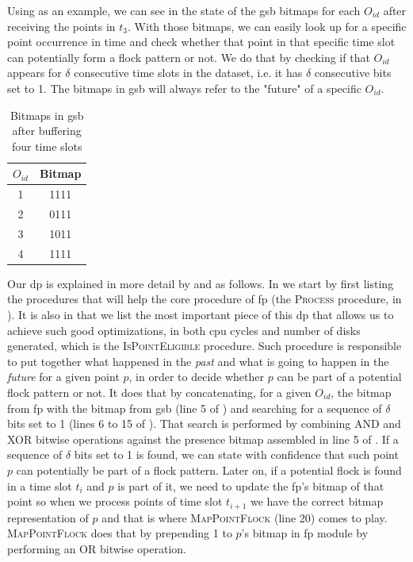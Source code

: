 Using  as an example, we can see in  the state of the \ac{gsb} bitmaps for each
$O_{id}$ after receiving the points in $t_3$. With those bitmaps, we can easily look up for a specific point occurrence
in time and check whether that point in that specific time slot can potentially form a flock pattern or not. We do that
by checking if that $O_{id}$ appears for $\delta$ consecutive time slots in the dataset, i.e. it has $\delta$
consecutive bits set to 1. The bitmaps in \ac{gsb} will always refer to the "future" of a specific $O_{id}$.

\begin{table}[h!]
    \renewcommand{\arraystretch}{1.3}
    \caption{Bitmaps in \ac{gsb} after buffering four time slots}
    \label{tab:bitmaps}
    \centering
    \begin{tabular}{c | c}
        \toprule
        $O_{id}$ &   Bitmap\\
        \toprule
        1        &   1111\\
        \bottomrule
        2        &   0111\\
        \bottomrule
        3        &   1011\\
        \bottomrule
        4        &   1111\\
        \bottomrule
    \end{tabular}
\end{table}

Our \ac{dp} is explained in more detail by  and  as follows. In
 we start by first listing the procedures that will help the core procedure of \ac{fp} (the
\textsc{Process} procedure, in ). It is also in  that we list the most important
piece of this \ac{dp} that allows us to achieve such good optimizations, in both \ac{cpu} cycles and number of disks
generated, which is the \textsc{IsPointEligible} procedure. Such procedure is responsible to put together what happened
in the \textit{past} and what is going to happen in the \textit{future} for a given point $p$, in order to decide
whether $p$ can be part of a potential flock pattern or not. It does that by concatenating, for a given $O_{id}$, the
bitmap from \ac{fp} with the bitmap from \ac{gsb} (line 5 of ) and searching for a sequence of
$\delta$ bits set to 1 (lines 6 to 15 of ). That search is performed by combining AND and XOR
bitwise operations against the presence bitmap assembled in line 5 of . If a sequence of
$\delta$ bits set to 1 is found, we can state with confidence that such point $p$ can potentially be part of a flock
pattern. Later on, if a potential flock is found in a time slot $t_i$ and $p$ is part of it, we need to update the
\ac{fp}'s bitmap of that point so when we process points of time slot $t_{i+1}$ we have the correct bitmap
representation of $p$ and that is where \textsc{MapPointFlock} (line 20) comes to play.  \textsc{MapPointFlock} does
that by prepending 1 to $p$'s bitmap in \ac{fp} module by performing an OR bitwise operation.

